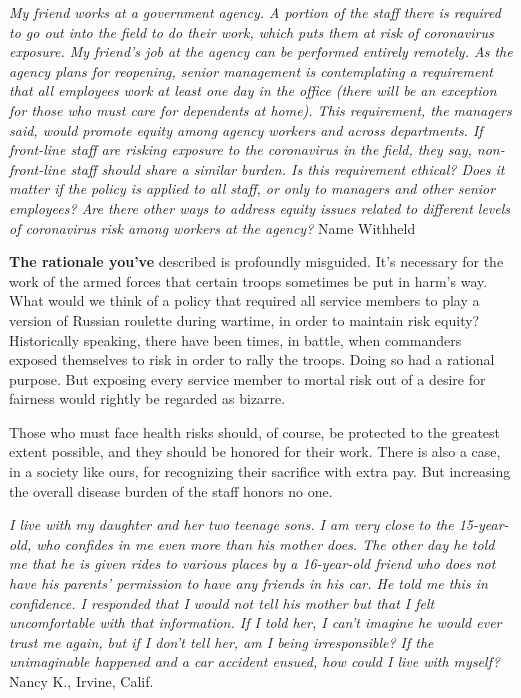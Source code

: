 \emph{My friend works at a government agency. A portion of the staff
there is required to go out into the field to do their work, which puts
them at risk of coronavirus exposure. My friend's job at the agency can
be performed entirely remotely. As the agency plans for reopening,
senior management is contemplating a requirement that all employees work
at least one day in the office (there will be an exception for those who
must care for dependents at home). This requirement, the managers said,
would promote equity among agency workers and across departments. If
front-line staff are risking exposure to the coronavirus in the field,
they say, non-front-line staff should share a similar burden. Is this
requirement ethical? Does it matter if the policy is applied to all
staff, or only to managers and other senior employees? Are there other
ways to address equity issues related to different levels of coronavirus
risk among workers at the agency?} Name Withheld

\textbf{The rationale you've} described is profoundly misguided. It's
necessary for the work of the armed forces that certain troops sometimes
be put in harm's way. What would we think of a policy that required all
service members to play a version of Russian roulette during wartime, in
order to maintain risk equity? Historically speaking, there have been
times, in battle, when commanders exposed themselves to risk in order to
rally the troops. Doing so had a rational purpose. But exposing every
service member to mortal risk out of a desire for fairness would rightly
be regarded as bizarre.

Those who must face health risks should, of course, be protected to the
greatest extent possible, and they should be honored for their work.
There is also a case, in a society like ours, for recognizing their
sacrifice with extra pay. But increasing the overall disease burden of
the staff honors no one.

\emph{I live with my daughter and her two teenage sons. I am very close
to the 15-year-old, who confides in me even more than his mother does.
The other day he told me that he is given rides to various places by a
16-year-old friend who does not have his parents' permission to have any
friends in his car. He told me this in confidence. I responded that I
would not tell his mother but that I felt uncomfortable with that
information. If I told her, I can't imagine he would ever trust me
again, but if I don't tell her, am I being irresponsible? If the
unimaginable happened and a car accident ensued, how could I live with
myself?} Nancy K., Irvine, Calif.

